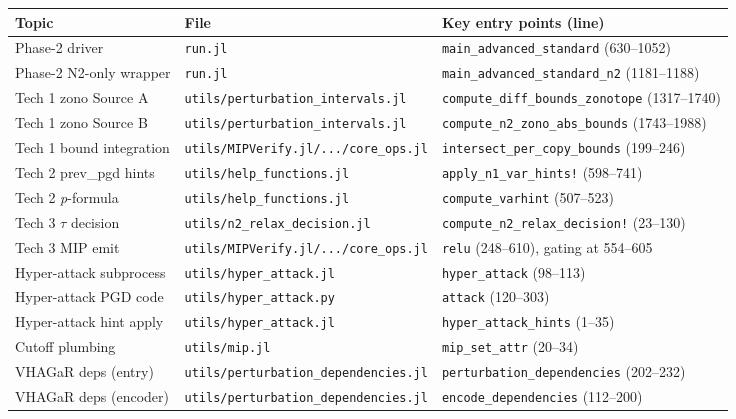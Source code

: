 \documentclass[11pt]{article}
\newcommand{\src}[1]{\texttt{\small #1}}
\begin{document}
\begin{center}
\footnotesize
\begin{tabular}{@{}l l l@{}}
\toprule
Topic & File & Key entry points (line) \\
\midrule
Phase-2 driver           & \src{run.jl}                                        & \src{main\_advanced\_standard} (630--1052) \\
Phase-2 N2-only wrapper  & \src{run.jl}                                        & \src{main\_advanced\_standard\_n2} (1181--1188) \\[3pt]
Tech 1 zono Source A     & \src{utils/perturbation\_intervals.jl}              & \src{compute\_diff\_bounds\_zonotope} (1317--1740) \\
Tech 1 zono Source B     & \src{utils/perturbation\_intervals.jl}              & \src{compute\_n2\_zono\_abs\_bounds} (1743--1988) \\
Tech 1 bound integration & \src{utils/MIPVerify.jl/.../core\_ops.jl}            & \src{intersect\_per\_copy\_bounds} (199--246) \\
Tech 2 prev\_pgd hints   & \src{utils/help\_functions.jl}                      & \src{apply\_n1\_var\_hints!} (598--741) \\
Tech 2 \emph{p}-formula  & \src{utils/help\_functions.jl}                      & \src{compute\_varhint} (507--523) \\
Tech 3 $\tau$ decision   & \src{utils/n2\_relax\_decision.jl}                  & \src{compute\_n2\_relax\_decision!} (23--130) \\
Tech 3 MIP emit          & \src{utils/MIPVerify.jl/.../core\_ops.jl}            & \src{relu} (248--610), gating at 554--605 \\[3pt]
Hyper-attack subprocess  & \src{utils/hyper\_attack.jl}                        & \src{hyper\_attack} (98--113) \\
Hyper-attack PGD code    & \src{utils/hyper\_attack.py}                        & \src{attack} (120--303) \\
Hyper-attack hint apply  & \src{utils/hyper\_attack.jl}                        & \src{hyper\_attack\_hints} (1--35) \\
Cutoff plumbing          & \src{utils/mip.jl}                                  & \src{mip\_set\_attr} (20--34) \\[3pt]
VHAGaR deps (entry)      & \src{utils/perturbation\_dependencies.jl}           & \src{perturbation\_dependencies} (202--232) \\
VHAGaR deps (encoder)    & \src{utils/perturbation\_dependencies.jl}           & \src{encode\_dependencies} (112--200) \\
\bottomrule
\end{tabular}
\end{center}
\end{document}

